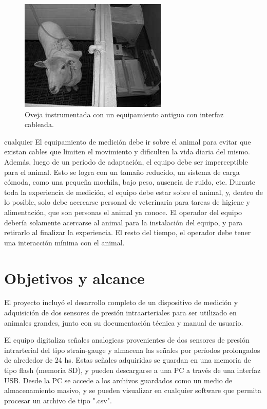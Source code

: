 \begin{figure}[!htbp]
	\centering
	\includegraphics[width=\textwidth]{./Figures/oveja.png}
	\caption{Oveja instrumentada con un equipamiento antiguo con interfaz cableada.}
	\label{fig:oveja}
\end{figure}
cualquier
El equipamiento de medición debe ir sobre el animal para evitar que existan cables que limiten el movimiento y dificulten la vida diaria del mismo. Además, luego de un período de adaptación, el equipo debe ser imperceptible para el animal. Esto se logra con un tamaño reducido, un sistema de carga cómoda, como una pequeña mochila, bajo peso, ausencia de ruido, etc. Durante toda la experiencia de medición, el equipo debe estar sobre el animal, y, dentro de lo posible, solo debe acercarse personal de veterinaria para tareas de higiene y alimentación, que son personas el animal ya conoce. El operador del equipo debería solamente acercarse al animal para la instalación del equipo, y para retirarlo al finalizar la experiencia. El resto del tiempo, el operador debe tener una interacción mínima con el animal.


\section{Objetivos y alcance}

El proyecto incluyó el desarrollo completo de un dispositivo de medición y adquisición de dos sensores de presión intraarteriales para ser utilizado en animales grandes, junto con su documentación técnica y manual de usuario. 

El equipo digitaliza señales analogicas provenientes de dos sensores de presión intrarterial del tipo strain-gauge y almacena las señales por períodos prolongados de alrededor de 24 hs. Estas señales adquiridas se guardan en una memoria de tipo flash (memoria SD), y pueden descargarse a una PC a través de una interfaz USB. Desde la PC se accede a los archivos guardados como un medio de almacenamiento masivo, y se pueden visualizar en cualquier software que permita procesar un archivo de tipo ".csv".

